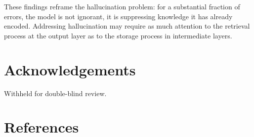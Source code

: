 \documentclass{article}
\begin{document}
These findings reframe the hallucination problem: for a substantial fraction
of errors, the model is not ignorant, it is suppressing knowledge it has
already encoded.
Addressing hallucination may require as much attention to the retrieval
process at the output layer as to the storage process in intermediate layers.

\section*{Acknowledgements}

Withheld for double-blind review.

\section*{References}
\end{document}

